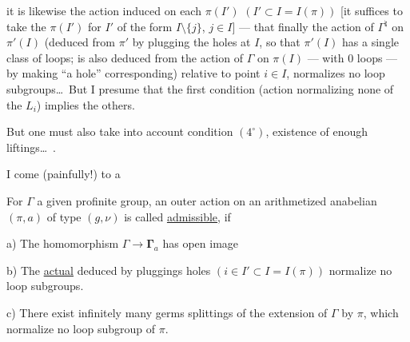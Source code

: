 
it is likewise  the action induced on each $\pi(I')$ $(I'\subset I=I(\pi))$ [it suffices to take the $\pi(I')$ for $I'$ of the form $I\setminus\{j\}$, $j\in I$] ---  that finally the action of $\Gamma^{\natural}$  on $\pi'(I)$ (deduced from $\pi'$ by plugging the holes at $I$, so that $\pi'(I)$ has a single class of loops;  is also deduced from the  action of $\Gamma$ on $\pi(I)$ --- with $0$  loops --- by making ``a hole'' corresponding) relative to  point $i\in I$, normalizes no loop subgroups\ldots\ But I presume that the first condition (action  normalizing none of the $L_i$) implies the others.


But one must  also take into account condition $(4^\circ)$, existence of enough liftings\ldots\ .

I come (painfully!) to a

 For $\Gamma$ a given profinite group, an outer action on an arithmetized anabelian $(\pi,a)$ of type $(g,\nu)$ is called \uline{admissible}, if


a)  The homomorphism $\Gamma\longrightarrow\boldsymbol{\Gamma}_a$ has open image

b) The \uline{actual}  deduced by pluggings  holes $(i\in I'\subset I=I(\pi))$ normalize no loop subgroups.


c) There exist infinitely many  germs  splittings of the extension of $\Gamma$ by $\pi$, which normalize no loop subgroup of $\pi$.


